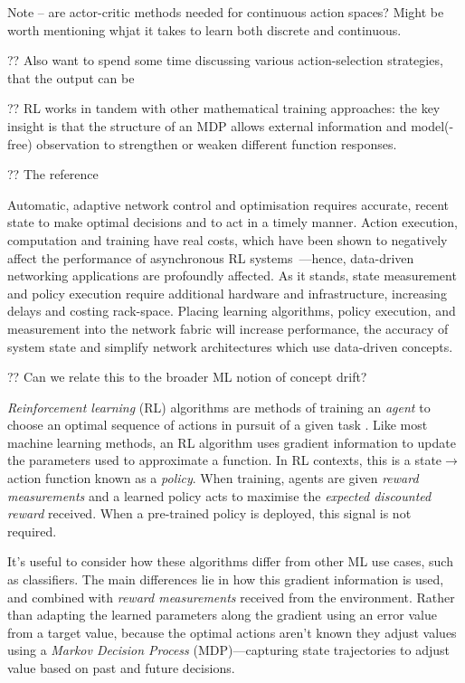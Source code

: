 Note -- are actor-critic methods needed for continuous action spaces? Might be worth mentioning whjat it takes to learn both discrete and continuous.

?? Also want to spend some time discussing various action-selection strategies, that the output can be

?? RL works in tandem with other mathematical training approaches: the key insight is that the structure of an MDP allows external information and model(-free) observation to strengthen or weaken different function responses.

?? The reference~\parencite{RL2E}

Automatic, adaptive network control and optimisation requires accurate, recent state to make optimal decisions and to act in a timely manner.
Action execution, computation and training have real costs, which have been shown to negatively affect the performance of asynchronous RL systems~\cite{DBLP:journals/firai/TravnikMSP18}---hence, data-driven networking applications are profoundly affected.
As it stands, state measurement and policy execution require additional hardware and infrastructure, increasing delays and costing rack-space.
Placing learning algorithms, policy execution, and measurement into the network fabric will increase performance, the accuracy of system state and simplify network architectures which use data-driven concepts.

?? Can we relate this to the broader ML notion of concept drift?

\emph{Reinforcement learning} (RL) algorithms are methods of training an \emph{agent} to choose an optimal sequence of actions in pursuit of a given task \cite{RL2E}.
Like most machine learning methods, an RL algorithm uses gradient information to update the parameters used to approximate a function.
In RL contexts, this is a state$\rightarrow$action function known as a \emph{policy}.
When training, agents are given \emph{reward measurements} and a learned policy acts to maximise the \emph{expected discounted reward} received.
When a pre-trained policy is deployed, this signal is not required.

It's useful to consider how these algorithms differ from other ML use cases, such as classifiers.
The main differences lie in how this gradient information is used, and combined with \emph{reward measurements} received from the environment.
Rather than adapting the learned parameters along the gradient using an error value from a target value, because the optimal actions aren't known they adjust values using a \emph{Markov Decision Process} (MDP)---capturing state trajectories to adjust value based on past and future decisions.

